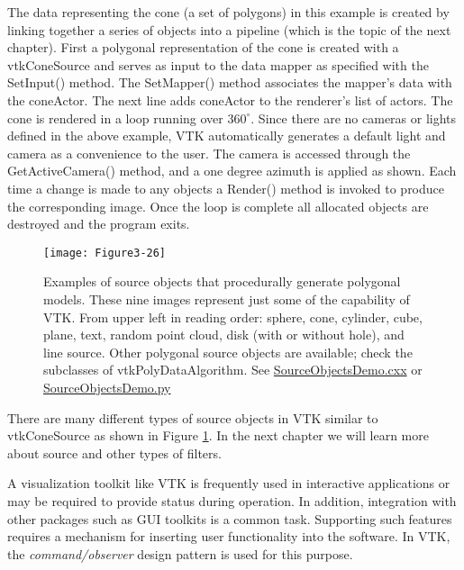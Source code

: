 \begin{description}[leftmargin=0cm,labelindent=0cm]
The data representing the cone (a set of polygons) in this example is created by linking together a series of objects into a pipeline (which is the topic of the next chapter). First a polygonal representation of the cone is created with a vtkConeSource and serves as input to the data mapper as specified with the SetInput() method. The SetMapper() method associates the mapper's data with the coneActor. The next line adds coneActor to the renderer's list of actors. The cone is rendered in a loop running over $360^\circ$. Since there are no cameras or lights defined in the above example, VTK automatically generates a default light and camera as a convenience to the user. The camera is accessed through the GetActiveCamera() method, and a one degree azimuth is applied as shown. Each time a change is made to any objects a Render() method is invoked to produce the corresponding image. Once the loop is complete all allocated objects are destroyed and the program exits.

\begin{figure}[!htb]
  \centering
  \texttt{[image: Figure3-26]}\\
  \caption{Examples of source objects that procedurally generate polygonal models. These nine images represent just some of the capability of VTK. From upper left in reading order: sphere, cone, cylinder, cube, plane, text, random point cloud, disk (with or without hole), and line source. Other polygonal source objects are available; check the subclasses of vtkPolyDataAlgorithm. See  \href{https://lorensen.github.io/VTKExamples/site/Cxx/GeometricObjects/SourceObjectsDemo/}{SourceObjectsDemo.cxx} or \href{https://lorensen.github.io/VTKExamples/site/Python/GeometricObjects/SourceObjectsDemo/}{SourceObjectsDemo.py}}\label{fig:Figure3-26}
\end{figure}

There are many different types of source objects in VTK similar to vtkConeSource as shown in Figure \ref{fig:Figure3-26}. In the next chapter we will learn more about source and other types of filters.

\item[Events and Observers.]
\label{sub:examples_events_observers}

A visualization toolkit like VTK is frequently used in interactive applications or may be required to provide status during operation. In addition, integration with other packages such as GUI toolkits is a common task. Supporting such features requires a mechanism for inserting user functionality into the software. In VTK, the \emph{command/observer}
 design pattern \cite{Gamma95} is used for this purpose.


\end{description}
